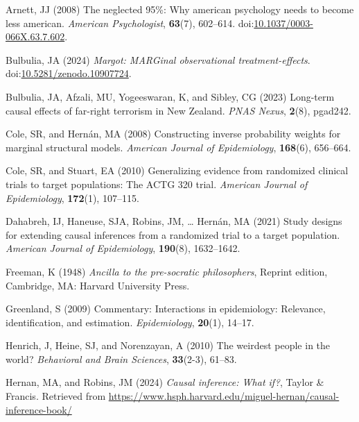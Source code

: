 \documentclass[
  single column]{article}
\newlength{\cslhangindent}
\newenvironment{CSLReferences}[2] %
 {\begin{list}{}{%
  \setlength{\itemindent}{0pt}
  \setlength{\leftmargin}{0pt}
  \setlength{\parsep}{0pt}
  \ifodd #1
   \setlength{\leftmargin}{\cslhangindent}
   \setlength{\itemindent}{-1\cslhangindent}
  \fi
  \setlength{\itemsep}{#2\baselineskip}}}
 {\end{list}}
\begin{document}
\label{refs}
\begin{CSLReferences}{1}{0}
Arnett, JJ (2008) The neglected 95\%: Why american psychology needs to
become less american. \emph{American Psychologist}, \textbf{63}(7),
602--614.
doi:\href{https://doi.org/10.1037/0003-066X.63.7.602}{10.1037/0003-066X.63.7.602}.

Bulbulia, JA (2024) \emph{Margot: MARGinal observational
treatment-effects}.
doi:\href{https://doi.org/10.5281/zenodo.10907724}{10.5281/zenodo.10907724}.

Bulbulia, JA, Afzali, MU, Yogeeswaran, K, and Sibley, CG (2023)
Long-term causal effects of far-right terrorism in {N}ew {Z}ealand.
\emph{PNAS Nexus}, \textbf{2}(8), pgad242.

Cole, SR, and Hernán, MA (2008) Constructing inverse probability weights
for marginal structural models. \emph{American Journal of Epidemiology},
\textbf{168}(6), 656--664.

Cole, SR, and Stuart, EA (2010) Generalizing evidence from randomized
clinical trials to target populations: The ACTG 320 trial.
\emph{American Journal of Epidemiology}, \textbf{172}(1), 107--115.

Dahabreh, IJ, Haneuse, SJA, Robins, JM, \ldots{} Hernán, MA (2021) Study
designs for extending causal inferences from a randomized trial to a
target population. \emph{American Journal of Epidemiology},
\textbf{190}(8), 1632--1642.

Freeman, K (1948) \emph{Ancilla to the pre-socratic philosophers},
Reprint edition, Cambridge, MA: Harvard University Press.

Greenland, S (2009) Commentary: Interactions in epidemiology: Relevance,
identification, and estimation. \emph{Epidemiology}, \textbf{20}(1),
14--17.

Henrich, J, Heine, SJ, and Norenzayan, A (2010) The weirdest people in
the world? \emph{Behavioral and Brain Sciences}, \textbf{33}(2-3),
61--83.

Hernan, MA, and Robins, JM (2024) \emph{Causal inference: What if?},
Taylor \& Francis. Retrieved from
\url{https://www.hsph.harvard.edu/miguel-hernan/causal-inference-book/}


\end{CSLReferences}
\end{document}
